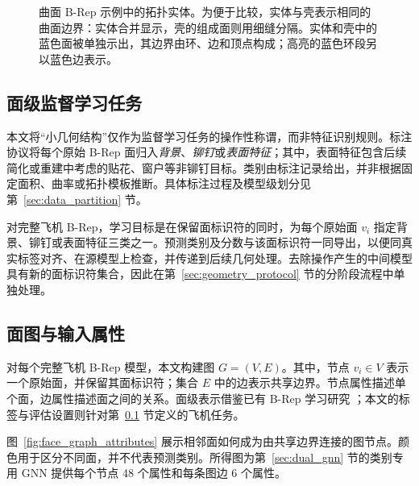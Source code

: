 \documentclass[12pt,a4paper]{ctexart}
\begin{document}
\begin{figure}[!ht]
\caption{曲面 B-Rep 示例中的拓扑实体。为便于比较，实体与壳表示相同的曲面边界：实体合并显示，壳的组成面则用细缝分隔。实体和壳中的蓝色面被单独示出，其边界由环、边和顶点构成；高亮的蓝色环段另以蓝色边表示。}\label{fig:brep_preliminary}
\end{figure}
\FloatBarrier

\subsection{面级监督学习任务}\label{sec:data_preparation}

本文将“小几何结构”仅作为监督学习任务的操作性称谓，而非特征识别规则。标注协议将每个原始 B-Rep 面归入\textit{背景}、\textit{铆钉}或\textit{表面特征}；其中，表面特征包含后续简化或重建中考虑的贴花、窗户等非铆钉目标。类别由标注记录给出，并非根据固定面积、曲率或拓扑模板推断。具体标注过程及模型级划分见第~\ref{sec:data_partition} 节。

对完整飞机 B-Rep，学习目标是在保留面标识符的同时，为每个原始面 $v_i$ 指定背景、铆钉或表面特征三类之一。预测类别及分数与该面标识符一同导出，以便同真实标签对齐、在源模型上检查，并传递到后续几何处理。去除操作产生的中间模型具有新的面标识符集合，因此在第~\ref{sec:geometry_protocol} 节的分阶段流程中单独处理。

\subsection{面图与输入属性}\label{sec:face_graph}

对每个完整飞机 B-Rep 模型，本文构建图 $G=(V,E)$。其中，节点 $v_i\in V$ 表示一个原始面，并保留其面标识符；集合 $E$ 中的边表示共享边界。节点属性描述单个面，边属性描述面之间的关系。面级表示借鉴已有 B-Rep 学习研究 \parencite{yeo2021machining,zhang2024brep2seq}；本文的标签与评估设置则针对第~\ref{sec:data_preparation} 节定义的飞机任务。

图~\ref{fig:face_graph_attributes} 展示相邻面如何成为由共享边界连接的图节点。颜色用于区分不同面，并不代表预测类别。所得图为第~\ref{sec:dual_gnn} 节的类别专用 GNN 提供每个节点 48 个属性和每条图边 6 个属性。
\end{document}
